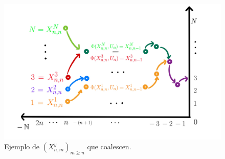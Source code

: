 \begin{figure}
    \centering
    \includegraphics[scale=0.16]{img/clase_12_pag_9.jpg}
    \caption{Ejemplo de $(X^y_{n,m})_{m\geq n}$ que coalescen.}
    \label{fig:past}
\end{figure}




